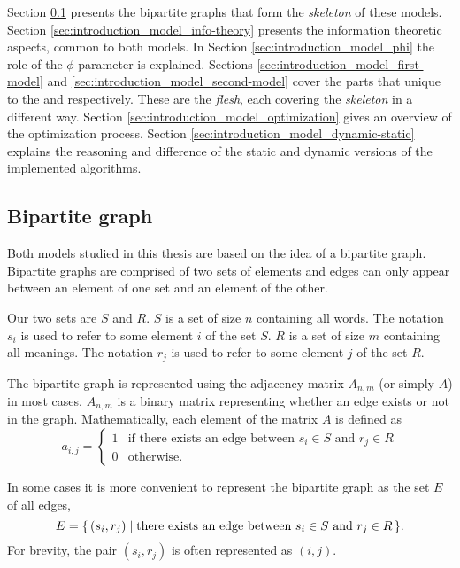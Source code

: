 Section \ref{sec:introduction_model_graph} presents the bipartite graphs that form the \emph{skeleton} of these models.
Section \ref{sec:introduction_model_info-theory} presents the information theoretic aspects, common to both models.
In Section \ref{sec:introduction_model_phi} the role of the $\phi$ parameter is explained.
Sections \ref{sec:introduction_model_first-model} and \ref{sec:introduction_model_second-model} cover the parts that unique to the \firstm{} and \secondmodel{} respectively. These are the \emph{flesh}, each covering the \emph{skeleton} in a different way.
Section \ref{sec:introduction_model_optimization} gives an overview of the optimization process.
Section \ref{sec:introduction_model_dynamic-static} explains the reasoning and difference of the static and dynamic versions of the implemented algorithms.

\subsection{Bipartite graph}
\label{sec:introduction_model_graph}

Both models studied in this thesis are based on the idea of a bipartite graph.
Bipartite graphs are comprised of two sets of elements and edges can only appear between an element of one set and an element of the other.

Our two sets are $S$ and $R$.
$S$ is a set of size $n$ containing all words.
The notation $s_i$ is used to refer to some element $i$ of the set $S$.
$R$ is a set of size $m$ containing all meanings.
The notation $r_j$ is used to refer to some element $j$ of the set $R$.

The bipartite graph is represented using the adjacency matrix $A_{n,m}$ (or simply $A$) in most cases.
$A_{n,m}$ is a \nbym{} binary matrix representing whether an edge exists or not in the graph.
Mathematically, each element of the matrix $A$ is defined as
\begin{equation*}
  a_{i,j} =
  \begin{cases}
    1 & \text{if there exists an edge between $s_i \in S$ and $r_j \in R$} \\
    0 & \text{otherwise.}
  \end{cases}
\end{equation*}

In some cases it is more convenient to represent the bipartite graph as the set $E$ of all edges,
\begin{equation*}
  E = \{\,(s_i,r_j)\mid\text{there exists an edge between $s_i \in S$ and $r_j \in R$}\,\}.
\end{equation*}
For brevity, the pair $(s_i, r_j)$ is often represented as $(i,j)$.


